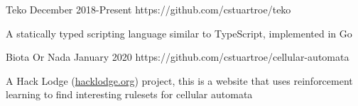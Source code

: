 

\begin{cventries}

  \projectentry
    {Teko}
    {December 2018-Present}
    {https://github.com/cstuartroe/teko}
    {
      \begin{cvitems}
        \item {
          A statically typed scripting language similar to TypeScript, implemented in Go
        }
      \end{cvitems}
    }

  \projectentry
    {Biota Or Nada}
    {January 2020}
    {https://github.com/cstuartroe/cellular-automata}
    {
      \begin{cvitems}
        \item {
          A Hack Lodge (\href{https://hacklodge.org/}{hacklodge.org}) project,
          this is a website that uses reinforcement learning to find interesting
          rulesets for cellular automata
        }
      \end{cvitems}
    }

\end{cventries}
